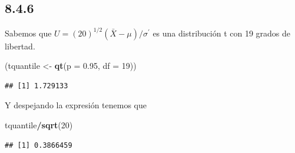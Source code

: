 \documentclass[
  12pt,
]{book}
\newenvironment{Shaded}{\begin{snugshade}}{\end{snugshade}}
\newcommand{\DataTypeTok}[1]{\textcolor[rgb]{0.13,0.29,0.53}{#1}}
\newcommand{\DecValTok}[1]{\textcolor[rgb]{0.00,0.00,0.81}{#1}}
\newcommand{\FloatTok}[1]{\textcolor[rgb]{0.00,0.00,0.81}{#1}}
\newcommand{\KeywordTok}[1]{\textcolor[rgb]{0.13,0.29,0.53}{\textbf{#1}}}
\newcommand{\NormalTok}[1]{#1}
\newcommand{\OperatorTok}[1]{\textcolor[rgb]{0.81,0.36,0.00}{\textbf{#1}}}
\newcommand{\StringTok}[1]{\textcolor[rgb]{0.31,0.60,0.02}{#1}}
\begin{document}
\hypertarget{section}{%
\subsection{8.4.6}\label{section}}

Sabemos que \(U = (20)^{1/2} (\bar{X}-\mu)/\sigma^\prime\) es una distribución t con 19 grados de libertad.

\begin{Shaded}
\begin{Highlighting}[]
\NormalTok{(tquantile \textless{}{-}}\StringTok{ }\KeywordTok{qt}\NormalTok{(}\DataTypeTok{p =} \FloatTok{0.95}\NormalTok{, }\DataTypeTok{df =} \DecValTok{19}\NormalTok{))}
\end{Highlighting}
\end{Shaded}

\begin{verbatim}
## [1] 1.729133
\end{verbatim}

Y despejando la expresión tenemos que

\begin{Shaded}
\begin{Highlighting}[]
\NormalTok{tquantile}\OperatorTok{/}\KeywordTok{sqrt}\NormalTok{(}\DecValTok{20}\NormalTok{)}
\end{Highlighting}
\end{Shaded}

\begin{verbatim}
## [1] 0.3866459
\end{verbatim}

\printbibliography
\end{document}
